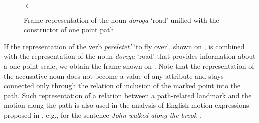 \begin{figure}
\begin{minipage}{0.31\textwidth}
\end{minipage}\hfill%
\begin{minipage}{0.6\textwidth}\centering
{}\\
 $\in$ 
\end{minipage}
\caption{Frame representation of the noun \textit{doroga} `road' unified with the constructor of one point path \label{frame:road:point}}
\end{figure}

If the representation of the verb \textit{pereletet'} `to fly over', shown on , is combined with the representation of the noun \textit{doroga} `road' that provides information about a one point scale, we obtain the frame shown on . Note that the representation of the accusative noun does not become a value of any attribute and stays connected only through the relation of inclusion of the marked point into the path. Such representation of a relation between a path-related landmark and the motion along the path is also used in the analysis of English motion expressions proposed in \citealt{KallmeyerOsswald:13}, e.g., for the sentence \textit{John walked along the brook} \citep[32, Figure~23]{KallmeyerOsswald:13}.

